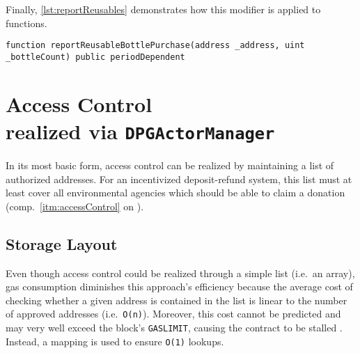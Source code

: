\FloatBarrier

Finally, \autoref{lst:reportReusables} demonstrates how this modifier is applied to functions.

\begin{lstlisting}[language=Solidity, caption=Function signature to report reusable bottle purchases, label=lst:reportReusables]
function reportReusableBottlePurchase(address _address, uint _bottleCount) public periodDependent
\end{lstlisting}



\pagebreak

\section[Access Control]{Access Control\\ {\normalsize realized via \texttt{DPGActorManager}}}
In its most basic form, access control can be realized by maintaining a list of authorized addresses. For an incentivized deposit-refund system, this list must at least cover all environmental agencies which should be able to claim a donation (comp.~\ref{itm:accessControl} on ). 

\subsection{Storage Layout}
Even though access control could be realized through a simple list (i.e.~an array), gas consumption diminishes this approach's efficiency because the average cost of checking whether a given address is contained in the list is linear to the number of approved addresses (i.e.~\texttt{O(n)}). Moreover, this cost cannot be predicted and may very well exceed the block's \texttt{GASLIMIT}, causing the contract to be stalled \cite[p.~122]{solidityDocs}. Instead, a mapping is used to ensure \texttt{O(1)} lookups.

